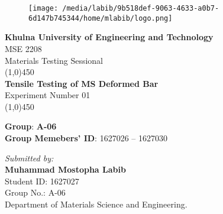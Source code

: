 \documentclass[12pt,a4paper]{article}
\begin{document}
\begin{titlepage}
	\begin{center}
		\begin{figure}
		\centering
		\texttt{[image: /media/labib/9b518def-9063-4633-a0b7-6d147b745344/home/mlabib/logo.png]} 
		\end{figure}
		\Large{\textbf{Khulna University of Engineering and Technology}}\\
		[1cm]
		\Large{MSE 2208}\\
		[.2cm]
		\Large{Materials Testing Sessional}\\
		[.5cm]
		\linethickness{2pt}
		\line(1,0){450} \\
		[.25in]
		\Huge{\bfseries{Tensile Testing of MS Deformed Bar}}\\
		[5mm]
		\large{Experiment Number 01}\\
		[1mm]
		\line(1,0){450}\\
		[2cm]
	\end{center}
	\begin{flushleft}
   \textbf{Group}: \textbf{A-06}\\
   \textbf{Group Memebers' ID}: 1627026 -- 1627030\\
    [.5cm]
	\end{flushleft}

\begin{flushleft}
\textit{Submitted by:}\\
		[2mm]
		\textbf{Muhammad Mostopha Labib}\\
		Student ID: 1627027\\
		Group No.: A-06\\
		Department of Materials Science and Engineering.\\
\end{flushleft}


\end{titlepage}
\end{document}
